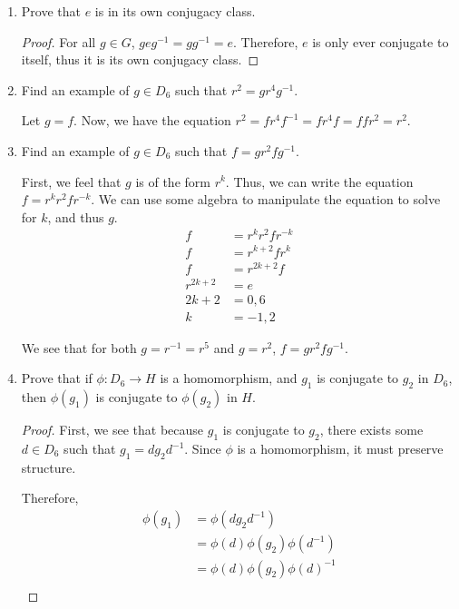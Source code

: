 \documentclass{article}
\newcommand{\inv}{^{-1}}
\begin{document}
\begin{enumerate}
    \item {
        Prove that \(e\) is in its own conjugacy class.

        \begin{proof}
            For all \(g \in G\), \(g e g\inv = g g\inv = e\). Therefore, \(e\) 
            is only ever conjugate to itself, thus it is its own conjugacy class.
        \end{proof}
    }

    \item {
        Find an example of \(g \in D_6\) such that \(r^2 = g r^4 g^{-1}\).
    
        Let \(g = f\). Now, we have the equation \(r^2 = f r^4 f\inv = f r^4 f = ff r^2 = r^2 \). 
    }

    \item {
        Find an example of \(g \in D_6\) such that \(f = gr^2fg\inv\).

        First, we feel that \(g\) is of the form \(r^k\). Thus, we can write the 
        equation \(f = r^k r^2 f r^{-k}\). We can use some algebra to manipulate 
        the equation to solve for \(k\), and thus \(g\). 
        \begin{align}
            f &= r^k r^2 f r^{-k} \\
            f &= r^{k+2} f r^k \\
            f &= r^{2k + 2} f \\
            r^{2k + 2} &= e \\
            2k + 2 &= 0, 6 \\
            k &= -1, 2
        \end{align}

        We see that for both \(g = r\inv = r^5\) and \(g = r^2\), \(f = g r^2f g\inv\).
    }

    \item {
        Prove that if \(\phi\colon D_6 \to H\) is a homomorphism, and \(g_1\) is conjugate to \(g_2\) in \(D_6\), then \(\phi(g_1)\) is conjugate to \(\phi(g_2)\) in \(H\).
    
        \begin{proof}
            First, we see that because \(g_1\) is conjugate to \(g_2\), there exists 
            some \(d \in D_6\) such that \(g_1 = d g_2 d\inv\). Since \(\phi\) is 
            a homomorphism, it must preserve structure.

            Therefore, 
            \begin{align}
                \phi(g_1)   &= \phi(d g_2 d\inv) \\
                            &= \phi(d) \phi(g_2) \phi(d\inv) \\
                            &= \phi(d) \phi(g_2) \phi(d)\inv \\
            \end{align}


\end{proof}}
\end{enumerate}
\end{document}
